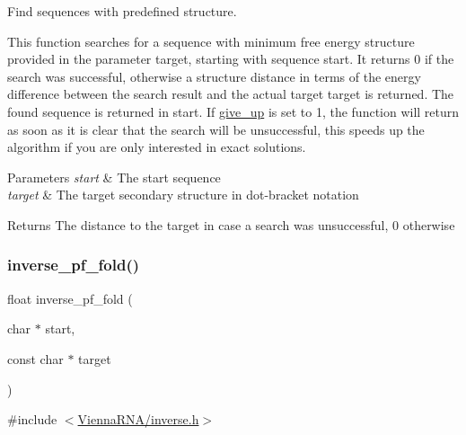 Find sequences with predefined structure. 

This function searches for a sequence with minimum free energy structure provided in the parameter \textquotesingle{}target\textquotesingle{}, starting with sequence \textquotesingle{}start\textquotesingle{}. It returns 0 if the search was successful, otherwise a structure distance in terms of the energy difference between the search result and the actual target \textquotesingle{}target\textquotesingle{} is returned. The found sequence is returned in \textquotesingle{}start\textquotesingle{}. If \hyperlink{group__inverse__fold_ga7ec4ba51f86e1717a1e174264e4a75ce}{give\+\_\+up} is set to 1, the function will return as soon as it is clear that the search will be unsuccessful, this speeds up the algorithm if you are only interested in exact solutions.


\begin{DoxyParams}{Parameters}
{\em start} & The start sequence \\
\hline
{\em target} & The target secondary structure in dot-\/bracket notation \\
\hline
\end{DoxyParams}
\begin{DoxyReturn}{Returns}
The distance to the target in case a search was unsuccessful, 0 otherwise 
\end{DoxyReturn}
\mbox{\label{group__inverse__fold_gaeef52ecbf2a2450ad585a344f9826806}} 
\subsubsection{\texorpdfstring{inverse\+\_\+pf\+\_\+fold()}{inverse\_pf\_fold()}}
{\footnotesize\ttfamily float inverse\+\_\+pf\+\_\+fold (\begin{DoxyParamCaption}\item[{char $\ast$}]{start,  }\item[{const char $\ast$}]{target }\end{DoxyParamCaption})}



{\ttfamily \#include $<$\hyperlink{inverse_8h}{Vienna\+R\+N\+A/inverse.\+h}$>$}




